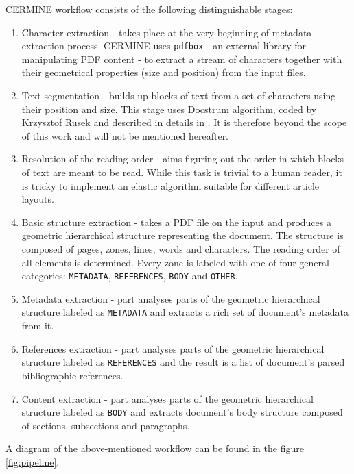 CERMINE workflow consists of the following distinguishable stages:
\begin{enumerate}
    \item {Character extraction} - takes place at the very beginning of metadata extraction process. CERMINE uses \verb+pdfbox+ - an external library for manipulating PDF content - to extract a stream of characters together with their geometrical properties (size and position) from the input files.
    \item {Text segmentation} - builds up blocks of text from a set of characters using their position and size. This stage uses Docstrum algorithm, coded by Krzysztof Rusek and described in details in \cite{O'Gorman1993}. It is therefore beyond the scope of this work and will not be mentioned hereafter.
    \item {Resolution of the reading order} - aims figuring out the order in which blocks of text are meant to be read. While this task is trivial to a human reader, it is tricky to implement an elastic algorithm suitable for different article layouts.
    \item {Basic structure extraction} - takes a PDF file on the input and produces a geometric hierarchical structure representing the document. The structure is composed of pages, zones, lines, words and characters. The reading order of all elements is determined. Every zone is labeled with one of four general categories: \verb+METADATA+, \verb+REFERENCES+, \verb+BODY+ and \verb+OTHER+.
    \item {Metadata extraction} - part analyses parts of the geometric hierarchical structure labeled as \verb+METADATA+ and extracts a rich set of document's metadata from it.
    \item {References extraction} - part analyses parts of the geometric hierarchical structure labeled as \verb+REFERENCES+ and the result is a list of document's parsed bibliographic references.
    \item {Content extraction} - part analyses parts of the geometric hierarchical structure labeled as \verb+BODY+ and extracts document's body structure composed of sections, subsections and paragraphs. 
\end{enumerate}
A diagram of the above-mentioned workflow can be found in the figure \ref{fig:pipeline}.
